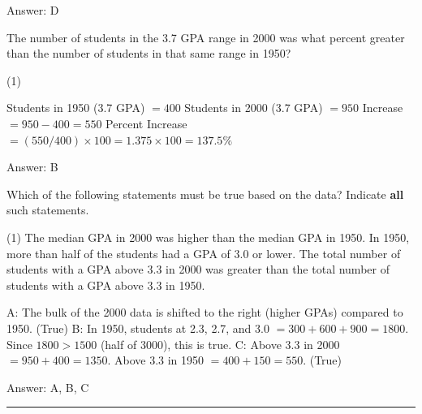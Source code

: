 \documentclass[11pt,paper=a4,answers]{exam}
\begin{document}
\begin{questions}
\begin{solution}
Answer: \colorbox{yellow!100}{D}
\end{solution}

\vspace{1cm}

\question
The number of students in the 3.7 GPA range in 2000 was what percent greater than the number of students in that same range in 1950?

\begin{tasks}(1)
\end{tasks}

\begin{solution}
\begin{center}
Students in 1950 (3.7 GPA) $= 400$
\vspace{5pt}
Students in 2000 (3.7 GPA) $= 950$
\vspace{10pt}
Increase $= 950 - 400 = 550$
\vspace{5pt}
Percent Increase $= (550 / 400) \times 100 = 1.375 \times 100 = 137.5\%$
\end{center}

Answer: \colorbox{yellow!100}{B}
\end{solution}

\vspace{1cm}

\question
Which of the following statements must be true based on the data?
Indicate \textbf{all} such statements.

\begin{tasks}(1)
\task[A)] The median GPA in 2000 was higher than the median GPA in 1950.
\task[B)] In 1950, more than half of the students had a GPA of 3.0 or lower.
\task[C)] The total number of students with a GPA above 3.3 in 2000 was greater than the total number of students with a GPA above 3.3 in 1950.
\end{tasks}

\begin{solution}
\begin{center}
A: The bulk of the 2000 data is shifted to the right (higher GPAs) compared to 1950. (True)
\vspace{5pt}
B: In 1950, students at 2.3, 2.7, and 3.0 $= 300 + 600 + 900 = 1800$. Since $1800 > 1500$ (half of 3000), this is true.
\vspace{5pt}
C: Above 3.3 in 2000 $= 950 + 400 = 1350$. Above 3.3 in 1950 $= 400 + 150 = 550$. (True)
\end{center}

Answer: \colorbox{yellow!100}{A, B, C}
\end{solution}


\end{questions}
\begin{center}
\rule{.5\textwidth}{1pt}
\end{center}
\end{document}

